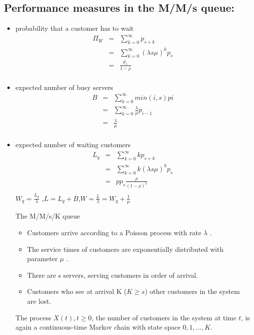 \documentclass[a4paper12pt]{article}
\begin{document}
\subsection*{Performance measures in the M/M/s queue:}
\begin{itemize}
\item probability that a customer has to wait
\begin{eqnarray*}
\Pi_{W} 
&=&\sum^{\infty}_{k=0} p_{s+k} \\
&=&\sum^{\infty}_{k=0} \left(\lambda s\mu \right)^kp_{s}\\
&=& \frac{p_s}{1-\rho}\\
\end{eqnarray*}
\item expected number of busy servers
\begin{eqnarray*}
B &=&\sum^{\infty}_{k=0} min(i, s) pi \\
&=&\sum^{\infty}_{k=0} \frac{\lambda}{\mu}  p_{i - 1} \\
&=&\frac{\lambda}{\mu}\\
\end{eqnarray*}
\item expected number of waiting customers
\begin{eqnarray*}
L_{q} &=& \sum^{\infty}_{k=0}k p_{s+k} \\
&=& \sum^{\infty}_{k=0} k\left(\lambda s\mu \right)^kp_{s}\\
&=& pp_{s}\frac{\rho}{(1  -  \rho )^2}\\
\end{eqnarray*}
${ \displaystyle W_{q} = \frac{L_{q}}{\lambda}}$ ,\qquad ${ \displaystyle L = L_{q} + B}$,\qquad ${ \displaystyle W = \frac{L}{\lambda } = W_{q} + \frac{1}{\mu} }$

\newpage 

The M/M/s/K queue
\begin{itemize}
\item  Customers arrive according to a Poisson process with rate $\lambda$ .
\item  The service times of customers are exponentially distributed with parameter $\mu$ .
\item  There are s servers, serving customers in order of arrival.
\item  Customers who see at arrival K ($K \geq  s$) other customers in the system
are lost.
\end{itemize}
The process ${X(t), t \geq  0}$, the number of customers in the system at time
$t$, is again a continuous-time Markov chain with state space ${0, 1, . . . , K}$.


\end{itemize}
\end{document}
